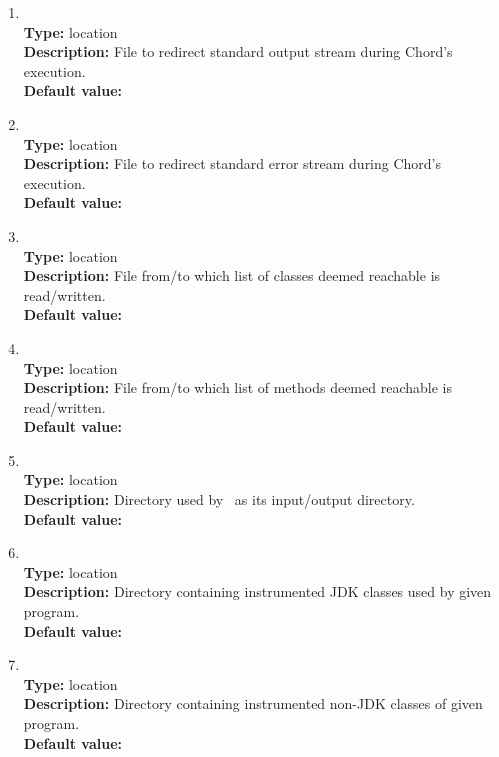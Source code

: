 \begin{enumerate}
\item
{} \\
{\bf Type:} location \\
{\bf Description:} File to redirect standard output stream during Chord's execution. \\
{\bf Default value:} 

\item
{} \\
{\bf Type:} location \\
{\bf Description:} File to redirect standard error stream during Chord's execution. \\
{\bf Default value:} 

\item
{} \\
{\bf Type:} location \\
{\bf Description:} File from/to which list of classes deemed reachable is read/written. \\
{\bf Default value:} 

\item
{} \\
{\bf Type:} location \\
{\bf Description:} File from/to which list of methods deemed reachable is read/written. \\
{\bf Default value:} 

\item
{} \\
{\bf Type:} location \\
{\bf Description:} Directory used by \bddbddb\ as its input/output directory. \\
{\bf Default value:} 

\item
{} \\
{\bf Type:} location \\
{\bf Description:} Directory containing instrumented JDK classes used by given program. \\
{\bf Default value:}  

\item
{} \\
{\bf Type:} location \\
{\bf Description:} Directory containing instrumented non-JDK classes of given program. \\
{\bf Default value:}  


\end{enumerate}
